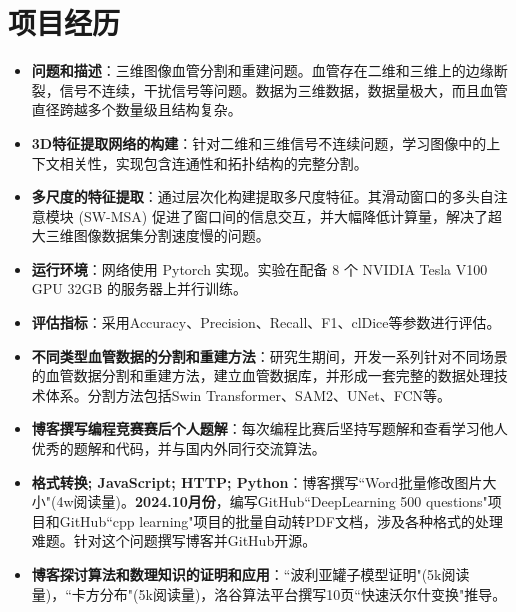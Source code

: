 \documentclass{resume}
\begin{document}

\section{项目经历}

\begin{itemize}	
	\item \textbf{问题和描述}：三维图像血管分割和重建问题。血管存在二维和三维上的边缘断裂，信号不连续，干扰信号等问题。数据为三维数据，数据量极大，而且血管直径跨越多个数量级且结构复杂。
	\item \textbf{3D特征提取网络的构建}：针对二维和三维信号不连续问题，学习图像中的上下文相关性，实现包含连通性和拓扑结构的完整分割。
	\item \textbf{多尺度的特征提取}：通过层次化构建提取多尺度特征。其滑动窗口的多头自注意模块 (SW-MSA) 促进了窗口间的信息交互，并大幅降低计算量，解决了超大三维图像数据集分割速度慢的问题。
	\item \textbf{运行环境}：网络使用 Pytorch 实现。实验在配备 8 个 NVIDIA Tesla V100 GPU 32GB 的服务器上并行训练。
	\item \textbf{评估指标}：采用Accuracy、Precision、Recall、F1、clDice等参数进行评估。
	\item \textbf{不同类型血管数据的分割和重建方法}：研究生期间，开发一系列针对不同场景的血管数据分割和重建方法，建立血管数据库，并形成一套完整的数据处理技术体系。分割方法包括Swin Transformer、SAM2、UNet、FCN等。
\end{itemize}

\begin{itemize}
  \item \textbf{博客撰写编程竞赛赛后个人题解}：每次编程比赛后坚持写题解和查看学习他人优秀的题解和代码，并与国内外同行交流算法。
  \item \textbf{格式转换; JavaScript; HTTP; Python}：博客撰写``Word批量修改图片大小"(4w阅读量)。\textbf{2024.10月份}，编写GitHub``DeepLearning 500 questions"项目和GitHub``cpp learning"项目的批量自动转PDF文档，涉及各种格式的处理难题。针对这个问题撰写博客并GitHub开源。
  \item \textbf{博客探讨算法和数理知识的证明和应用}：``波利亚罐子模型证明"(5k阅读量)，``卡方分布"(5k阅读量)，洛谷算法平台撰写10页``快速沃尔什变换"推导。
\end{itemize}
\end{document}
